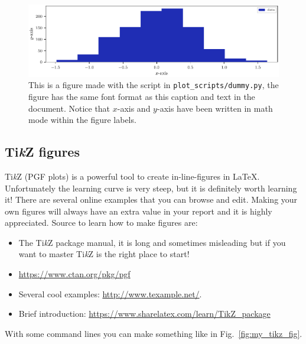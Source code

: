 \documentclass[
    10pt,
    a4paper,
    ]{article}
\begin{document}
\begin{figure}
    \centering
    \includegraphics{dummy.pdf}
    \caption{This is a figure made with the script in \texttt{plot\_scripts/dummy.py}, the figure has the same font format as this caption and text in the document. Notice that $x$-axis and $y$-axis have been written in math mode within the figure labels.}
    \label{fig:dummy}
\end{figure}

\subsection{Ti\textit{k}Z figures}
Ti\textit{k}Z  (PGF plots) is a powerful tool to create in-line-figures in \LaTeX. Unfortunately the learning curve is very steep, but it is definitely worth learning it! There are several online examples that you can browse and edit. Making your own figures will always have an extra value in your report and it is highly appreciated. Source to learn how to make figures are:
\begin{itemize}
    \item The Ti\textit{k}Z package manual, it is long and sometimes misleading but if you want to master Ti\textit{k}Z is the right place to start!
    \item \url{https://www.ctan.org/pkg/pgf}
    \item Several cool examples: \url{http://www.texample.net/}.
    \item Brief introduction: \url{https://www.sharelatex.com/learn/TikZ_package}
\end{itemize}

With some command lines you can make something like in Fig.~\ref{fig:my_tikz_fig}.
\end{document}
